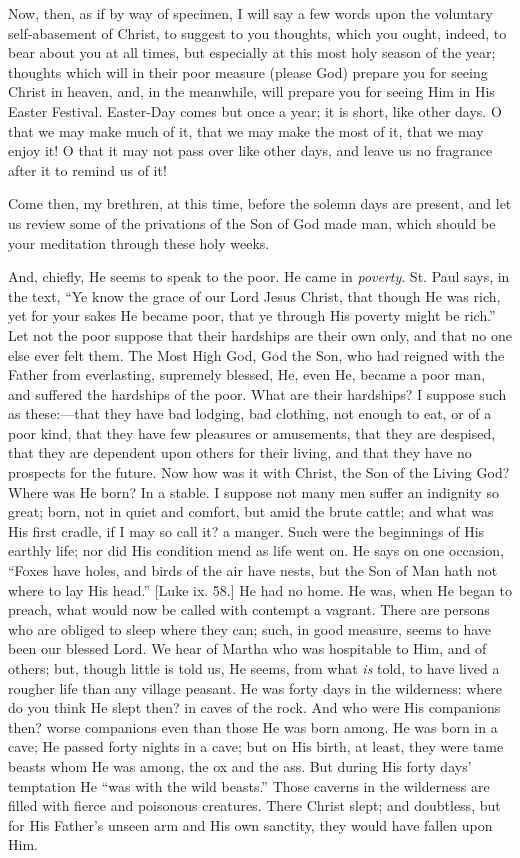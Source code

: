 Now, then, as if by way of specimen, I will say a few words upon the
voluntary self-abasement of Christ, to suggest to you thoughts, which
you ought, indeed, to bear about you at all times, but especially at
this most holy season of the year; thoughts which will in their poor
measure (please God) prepare you for seeing Christ in heaven, and, in
the meanwhile, will prepare you for seeing Him in His Easter Festival.
Easter-Day comes but once a year; it is short, like other days. O that
we may make much of it, that we may make the most of it, that we may
enjoy it! O that it may not pass over like other days, and leave us no
fragrance after it to remind us of it!

Come then, my brethren, at this time, before the solemn days are
present, and let us review some of the privations of the Son of God made
man, which should be your meditation through these holy weeks.

And, chiefly, He seems to speak to the poor. He came in \emph{poverty}.
St. Paul says, in the text, ``Ye know the grace of our Lord Jesus
Christ, that though He was rich, yet for your sakes He became poor, that
ye through His poverty might be rich.'' Let not the poor suppose
that their hardships are their own only, and that no one else ever felt
them. The Most High God, God the Son, who had reigned with the Father
from everlasting, supremely blessed, He, even He, became a poor man, and
suffered the hardships of the poor. What are their hardships? I suppose
such as these:—that they have bad lodging, bad clothing, not enough to
eat, or of a poor kind, that they have few pleasures or amusements, that
they are despised, that they are dependent upon others for their living,
and that they have no prospects for the future. Now how was it with
Christ, the Son of the Living God? Where was He born? In a stable. I
suppose not many men suffer an indignity so great; born, not in quiet
and comfort, but amid the brute cattle; and what was His first cradle,
if I may so call it? a manger. Such were the beginnings of His earthly
life; nor did His condition mend as life went on. He says on one
occasion, ``Foxes have holes, and birds of the air have nests, but
the Son of Man hath not where to lay His head.'' [Luke ix. 58.] He
had no home. He was, when He began to preach, what would now be called
with contempt a vagrant. There are persons who are obliged to sleep
where they can; such, in good measure, seems to have been our blessed
Lord. We hear of Martha who was hospitable to Him, and of others; but,
though little is told us, He seems, from what \emph{is} told, to have lived a
rougher life than any village peasant. He was forty days in the
wilderness: where do you think He slept then? in caves of the rock. And
who were His companions then? worse companions even than those He was
born among. He was born in a cave; He passed forty nights in a cave; but
on His birth, at least, they were tame beasts whom He was among, the ox
and the ass. But during His forty days' temptation He ``was with the
wild beasts.'' Those caverns in the wilderness are filled with
fierce and poisonous creatures. There Christ slept; and doubtless, but
for His Father's unseen arm and His own sanctity, they would have fallen
upon Him.

